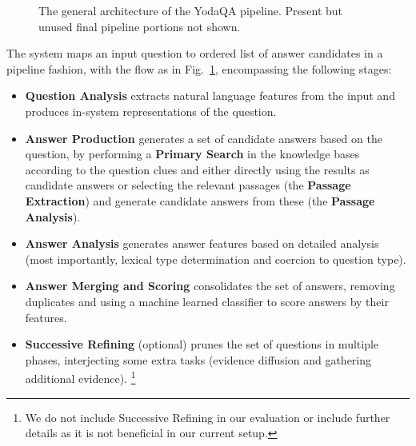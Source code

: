 \begin{figure}[ht]
\begin{center}
\caption{The general architecture of the YodaQA pipeline.  Present but unused final pipeline portions not shown.}
\label{fig:arch}
\end{center}
\end{figure}%

The system maps an input question to ordered list of answer candidates in a pipeline fashion,
with the flow as in Fig.~\ref{fig:arch}, encompassing the following stages:

\begin{itemize}
\item \textbf{Question Analysis} extracts natural language features from
	the input and produces in-system representations of the question.
\item \textbf{Answer Production} generates a set of candidate answers based on the question,
	by performing a \textbf{Primary Search} in the knowledge bases according to the question clues
	and either directly using the results as candidate answers
	or selecting the relevant passages (the \textbf{Passage Extraction})
	and generate candidate answers from these (the \textbf{Passage Analysis}).
\item \textbf{Answer Analysis} generates answer features based on detailed analysis (most importantly, lexical type determination and coercion to question type).
\item \textbf{Answer Merging and Scoring} consolidates the set of answers, removing duplicates and using a machine learned classifier to score answers by their features.
\item \textbf{Successive Refining} (optional) prunes the set of questions in multiple phases, interjecting some extra tasks (evidence diffusion and gathering additional evidence).%
\footnote{We do not include Successive Refining in our evaluation or include further details as it is not beneficial in our current setup.}
\end{itemize}

